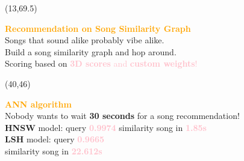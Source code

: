 \documentclass{beamer}
\begin{document}

\begin{textblock}{18}(13,69.5)
  \begin{basebox}[frame hidden, interior hidden, halign=center, valign=center]
    \color{white}

    \begin{minipage}{0.85\linewidth}
        {\textcolor{orange}{\LARGE\textbf{Recommendation on Song Similarity Graph}}} \\[0.1cm]
        
        {\Large Songs that sound alike probably vibe alike.} \\[0.1cm]
        
        {\Large Build a song similarity graph and hop around.} \\[0.1cm]
        
        {\Large Scoring based on \textcolor{pink}{\LARGE\textbf{3D scores} \Large and \LARGE\textbf{custom weights}!}}
    \end{minipage}

    \vspace{2cm}
  \end{basebox}
\end{textblock}


\begin{textblock}{20}(40,46)
  \begin{basebox}[frame hidden, interior hidden, halign=center, valign=center,colupper=white]

    \begin{minipage}{0.85\linewidth}
      {\textcolor{orange}{\LARGE \textbf{ANN algorithm}}}\\[0.1cm]
      
      {Nobody wants to wait \LARGE\textbf{30 seconds} for a song recommendation!}\\[0.1cm]
      
      {\textbf{HNSW} model: query \textcolor{pink}{\LARGE\textbf{0.9974}} similarity song in \textcolor{pink}{\LARGE\textbf{1.85s}}}\\ [0.1cm]

      {\textbf{LSH} model: query \textcolor{pink}{\LARGE\textbf{0.9665}} \\similarity song in \textcolor{pink}{\LARGE\textbf{22.612s}}}
      
    \end{minipage}

    \vspace{2cm}
  \end{basebox}
\end{textblock}
\end{document}
